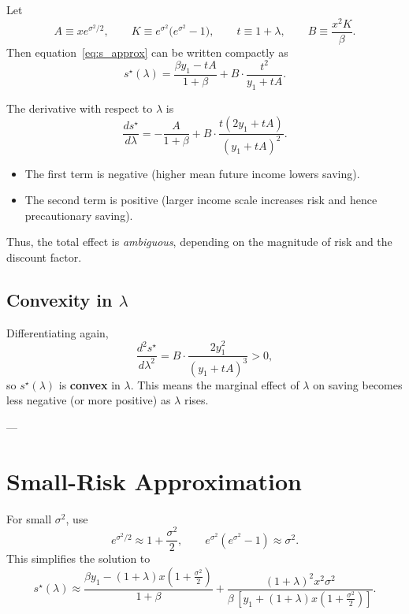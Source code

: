 \documentclass[12pt]{article}
\begin{document}
Let
\[
A \equiv x e^{\sigma^2/2},
\qquad
K \equiv e^{\sigma^2}\big(e^{\sigma^2}-1\big),
\qquad
t \equiv 1+\lambda,
\qquad
B \equiv \frac{x^2 K}{\beta}.
\]
Then equation~\eqref{eq:s_approx} can be written compactly as
\begin{equation}
s^\star(\lambda)
=
\frac{\beta y_1 - tA}{1+\beta}
+ 
B\cdot \frac{t^2}{y_1 + tA}.
\end{equation}

The derivative with respect to \(\lambda\) is
\begin{equation}
\frac{d s^\star}{d\lambda}
=
-\frac{A}{1+\beta}
+
B\cdot\frac{t(2y_1 + tA)}{(y_1 + tA)^2}.
\label{eq:dsdl}
\end{equation}
\begin{itemize}
    \item The first term is negative (higher mean future income lowers saving).
    \item The second term is positive (larger income scale increases risk and hence precautionary saving).
\end{itemize}
Thus, the total effect is \emph{ambiguous}, depending on the magnitude of risk and the discount factor.

\subsection*{Convexity in \(\lambda\)}

Differentiating again,
\begin{equation}
\frac{d^2 s^\star}{d\lambda^2}
=
B \cdot \frac{2y_1^2}{(y_1 + tA)^3} > 0,
\end{equation}
so \( s^\star(\lambda) \) is \textbf{convex} in \(\lambda\).  
This means the marginal effect of \(\lambda\) on saving becomes less negative (or more positive) as \(\lambda\) rises.

---

\section{Small-Risk Approximation}

For small \(\sigma^2\), use
\[
e^{\sigma^2/2}\approx 1+\frac{\sigma^2}{2},
\qquad
e^{\sigma^2}(e^{\sigma^2}-1)\approx \sigma^2.
\]
This simplifies the solution to
\begin{equation}
s^\star(\lambda)
\approx
\frac{\beta y_1 - (1+\lambda)x(1+\frac{\sigma^2}{2})}{1+\beta}
+
\frac{(1+\lambda)^2 x^2 \sigma^2}
{\beta\,[y_1 + (1+\lambda)x(1+\frac{\sigma^2}{2})]}.
\end{equation}
\end{document}
